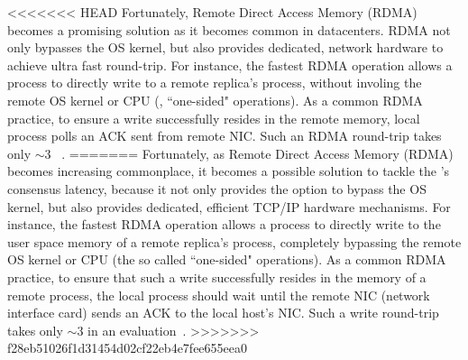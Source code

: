 



<<<<<<< HEAD
Fortunately, Remote Direct Access Memory (RDMA) becomes a promising solution 
as it becomes common in datacenters. RDMA not only bypasses the OS kernel, 
but also provides dedicated, network hardware to achieve ultra fast round-trip. 
For instance, the fastest RDMA operation allows a process to directly write to 
a remote replica's process, without involing the remote OS kernel or CPU (\ie, 
``one-sided" operations). As a common RDMA practice, to ensure a write 
successfully resides in the remote memory, local process polls an ACK sent 
from remote NIC. Such an RDMA round-trip takes only 
$\sim$3 \us~\cite{pilaf:usenix14}.
=======
Fortunately, as Remote Direct Access Memory (RDMA) becomes increasing
commonplace, it becomes a possible solution to tackle the \paxos's consensus
latency, because it not only provides the option to bypass the OS kernel, but
also provides dedicated, efficient TCP/IP hardware mechanisms. For instance,
the fastest RDMA operation allows a process to directly write to the user space
memory of a remote replica's process, completely bypassing the remote OS kernel
or CPU (the so called ``one-sided" operations). As a common RDMA practice, to
ensure that such a write successfully resides in the memory of a remote
process, the local process should wait until the remote NIC (network interface
card) sends an ACK to the local host's NIC. Such a write round-trip takes only
$\sim$3 \us in an evaluation~\cite{pilaf:usenix14}.
>>>>>>> f28eb51026f1d31454d02cf22eb4e7fee655eea0


